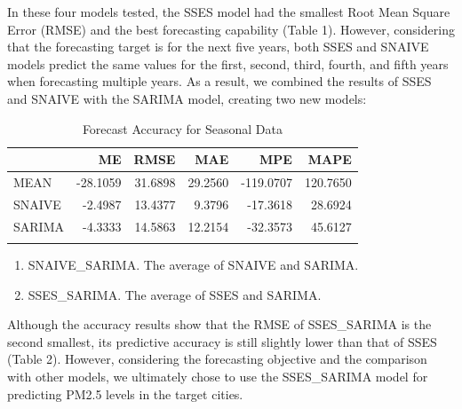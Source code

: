 \documentclass[
  12pt,
]{article}
\providecommand{\tightlist}{%
  \setlength{\itemsep}{0pt}\setlength{\parskip}{0pt}}
\begin{document}
In these four models tested, the SSES model had the smallest Root Mean
Square Error (RMSE) and the best forecasting capability (Table 1).
However, considering that the forecasting target is for the next five
years, both SSES and SNAIVE models predict the same values for the
first, second, third, fourth, and fifth years when forecasting multiple
years. As a result, we combined the results of SSES and SNAIVE with the
SARIMA model, creating two new models:

\begin{table}

\caption{\label{tab:accuacy_table1}Forecast Accuracy for Seasonal Data}
\centering
\begin{tabular}[t]{l|r|r|r|r|r}
\hline
  & ME & RMSE & MAE & MPE & MAPE\\
\hline
MEAN & -28.1059 & 31.6898 & 29.2560 & -119.0707 & 120.7650\\
\hline
SNAIVE & -2.4987 & 13.4377 & 9.3796 & -17.3618 & 28.6924\\
\hline
SARIMA & -4.3333 & 14.5863 & 12.2154 & -32.3573 & 45.6127\\
\hline
\cellcolor{gray!6}{SSES} & \cellcolor{gray!6}{4.8008} & \cellcolor{gray!6}{12.3008} & \cellcolor{gray!6}{7.7936} & \cellcolor{gray!6}{5.2446} & \cellcolor{gray!6}{19.6416}\\
\hline
\end{tabular}
\end{table}

\begin{enumerate}
\def\labelenumi{\arabic{enumi}.}
\setcounter{enumi}{4}
\tightlist
\item
  SNAIVE\_SARIMA. The average of SNAIVE and SARIMA.
\item
  SSES\_SARIMA. The average of SSES and SARIMA.
\end{enumerate}

Although the accuracy results show that the RMSE of SSES\_SARIMA is the
second smallest, its predictive accuracy is still slightly lower than
that of SSES (Table 2). However, considering the forecasting objective
and the comparison with other models, we ultimately chose to use the
SSES\_SARIMA model for predicting PM2.5 levels in the target cities.
\end{document}
